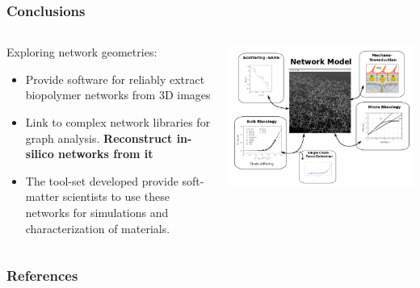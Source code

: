\documentclass[9pt]{beamer}
\begin{document}
\begin{frame}
  \frametitle{Conclusions}
  \begin{columns}[onlytextwidth]
      \begin{alertblock}{Exploring network geometries:}
          \begin{itemize}
              \item Provide software for reliably extract biopolymer networks from 3D images
              \item Link to complex network libraries for graph analysis. \textbf{Reconstruct in-silico networks from it}
              \item The tool-set developed provide soft-matter scientists to use these networks for simulations and characterization of materials.
          \end{itemize}
      \end{alertblock}
        \centering\includegraphics[width=\textwidth]{./Figures/network_model_fig.png}
  \end{columns}
\end{frame}
\begin{frame}[allowframebreaks]

  \frametitle{References}

  
  

\end{frame}
\end{document}
